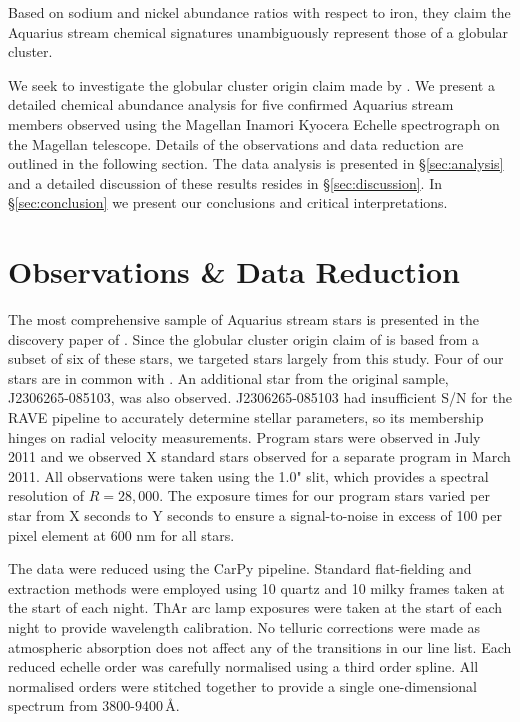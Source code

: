 \documentclass{emulateapj}
\begin{document}
 Based on sodium and nickel abundance ratios with respect to iron, they claim the Aquarius stream chemical signatures unambiguously represent those of a globular cluster.
 

We seek to investigate the globular cluster origin claim made by \citet{wylie-de-boer;et-al_2012}. We present a detailed chemical abundance analysis for five confirmed Aquarius stream members observed using the Magellan Inamori Kyocera Echelle spectrograph \citep{Bernstein;et-al_2003} on the Magellan telescope. Details of the observations and data reduction are outlined in the following section. The data analysis is presented in \S\ref{sec:analysis} and a detailed discussion of these results resides in \S\ref{sec:discussion}. In \S\ref{sec:conclusion} we present our conclusions and critical interpretations.

\section{Observations \& Data Reduction}

The most comprehensive sample of Aquarius stream stars is presented in the discovery paper of \citet{williams;et-al_2011}. Since the globular cluster origin claim of \citet{wylie-de-boer;et-al_2012} is based from a subset of six of these stars, we targeted stars largely from this study. Four of our stars are in common with \citet{wylie-de-boer;et-al_2012}. An additional star from the original \citet{williams;et-al_2011} sample, J2306265-085103, was also observed. J2306265-085103 had insufficient S/N for the RAVE pipeline to accurately determine stellar parameters, so its membership hinges on radial velocity measurements. Program stars were observed in July 2011 and we observed X standard stars observed for a separate program in March 2011. All observations were taken using the 1.0" slit, which provides a spectral resolution of $R = 28,000$. The exposure times for our program stars varied per star from X seconds to Y seconds to ensure a signal-to-noise in excess of 100 per pixel element at 600 nm for all stars.

The data were reduced using the CarPy pipeline. Standard flat-fielding and extraction methods were employed using 10 quartz and 10 milky frames taken at the start of each night. ThAr arc lamp exposures were taken at the start of each night to provide wavelength calibration. No telluric corrections were made as atmospheric absorption does not affect any of the transitions in our line list. Each reduced echelle order was carefully normalised using a third order spline. All normalised orders were stitched together to provide a single one-dimensional spectrum from 3800-9400\,\AA{}. 
\end{document}
